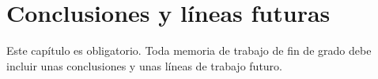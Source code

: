 \chapter{Conclusiones y líneas futuras}
\label{ch:conclusiones}

\noindent Este capítulo es obligatorio. Toda memoria de trabajo de fin de grado debe incluir unas conclusiones y unas líneas de trabajo futuro.